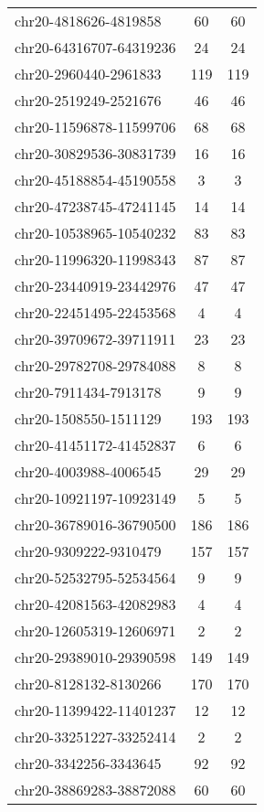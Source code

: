 \documentclass[10pt,letterpaper]{article}
\begin{document}
{\begin{longtable}{lSS}
	chr20-4818626-4819858   & 60     & 60       \\
	chr20-64316707-64319236 & 24     & 24       \\
	chr20-2960440-2961833   & 119    & 119      \\
	chr20-2519249-2521676   & 46     & 46       \\
	chr20-11596878-11599706 & 68     & 68       \\
	chr20-30829536-30831739 & 16     & 16       \\
	chr20-45188854-45190558 & 3      & 3        \\
	chr20-47238745-47241145 & 14     & 14       \\
	chr20-10538965-10540232 & 83     & 83       \\
	chr20-11996320-11998343 & 87     & 87       \\
	chr20-23440919-23442976 & 47     & 47       \\
	chr20-22451495-22453568 & 4      & 4        \\
	chr20-39709672-39711911 & 23     & 23       \\
	chr20-29782708-29784088 & 8      & 8        \\
	chr20-7911434-7913178   & 9      & 9        \\
	chr20-1508550-1511129   & 193    & 193      \\
	chr20-41451172-41452837 & 6      & 6        \\
	chr20-4003988-4006545   & 29     & 29       \\
	chr20-10921197-10923149 & 5      & 5        \\
	chr20-36789016-36790500 & 186    & 186      \\
	chr20-9309222-9310479   & 157    & 157      \\
	chr20-52532795-52534564 & 9      & 9        \\
	chr20-42081563-42082983 & 4      & 4        \\
	chr20-12605319-12606971 & 2      & 2        \\
	chr20-29389010-29390598 & 149    & 149      \\
	chr20-8128132-8130266   & 170    & 170      \\
	chr20-11399422-11401237 & 12     & 12       \\
	chr20-33251227-33252414 & 2      & 2        \\
	chr20-3342256-3343645   & 92     & 92       \\
	chr20-38869283-38872088 & 60     & 60       \\

\end{longtable}}
\end{document}
